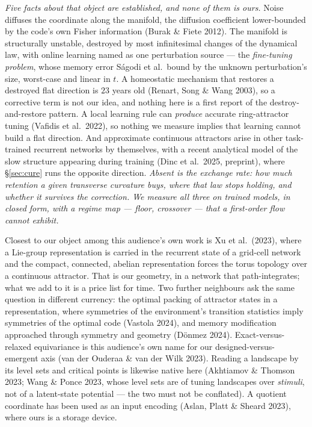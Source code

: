 \documentclass{article}
\begin{document}
\emph{Five facts about that object are established, and none of them is ours.} Noise diffuses the coordinate along the manifold, the diffusion coefficient lower-bounded by the code's own Fisher information (Burak \& Fiete 2012). The manifold is structurally unstable, destroyed by most infinitesimal changes of the dynamical law, with online learning named as one perturbation source --- the \emph{fine-tuning problem}, whose memory error S\'agodi et al.\ bound by the unknown perturbation's size, worst-case and linear in $t$. A homeostatic mechanism that restores a destroyed flat direction is $23$ years old (Renart, Song \& Wang 2003), so a corrective term is not our idea, and nothing here is a first report of the destroy-and-restore pattern. A local learning rule can \emph{produce} accurate ring-attractor tuning (Vafidis et al.\ 2022), so nothing we measure implies that learning cannot build a flat direction. And approximate continuous attractors arise in other task-trained recurrent networks by themselves, with a recent analytical model of the slow structure appearing during training (Dinc et al.\ 2025, preprint), where \S\ref{sec:cure} runs the opposite direction. \emph{Absent is the exchange rate: how much retention a given transverse curvature buys, where that law stops holding, and whether it survives the correction. We measure all three on trained models, in closed form, with a regime map --- floor, crossover --- that a first-order flow cannot exhibit.}

Closest to our object among this audience's own work is Xu et al.\ (2023), where a Lie-group representation is carried in the recurrent state of a grid-cell network and the compact, connected, abelian representation forces the torus topology over a continuous attractor. That is our geometry, in a network that path-integrates; what we add to it is a price list for time. Two further neighbours ask the same question in different currency: the optimal packing of attractor states in a representation, where symmetries of the environment's transition statistics imply symmetries of the optimal code (Vastola 2024), and memory modification approached through symmetry and geometry (D\"onmez 2024). Exact-versus-relaxed equivariance is this audience's own name for our designed-versus-emergent axis (van der Ouderaa \& van der Wilk 2023). Reading a landscape by its level sets and critical points is likewise native here (Akhtiamov \& Thomson 2023; Wang \& Ponce 2023, whose level sets are of tuning landscapes over \emph{stimuli}, not of a latent-state potential --- the two must not be conflated). A quotient coordinate has been used as an input encoding (Aslan, Platt \& Sheard 2023), where ours is a storage device.
\end{document}
